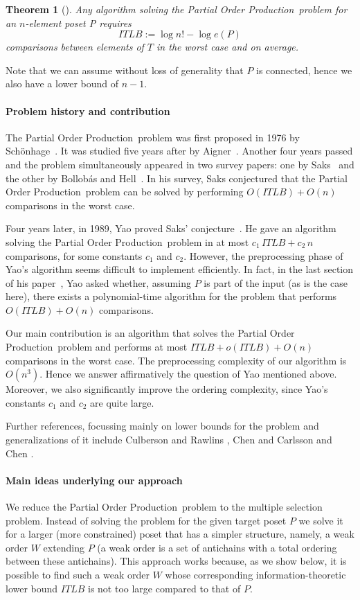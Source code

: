 \documentclass[12pt,oneside]{article}
\newtheorem{theorem}{Theorem}
\newcommand{\partsort}{{\sc Partial Order Production}}
\begin{document}
\begin{theorem}[\hspace{-.01em}\cite{S76, A81, Y89}]
Any algorithm solving the \partsort\ problem for an $n$-element poset P requires
\begin{equation*}
ITLB := \log n! - \log e(P)
\end{equation*}
comparisons between elements of $T$ in the worst case and on average.
\end{theorem}

Note that we can assume without loss of generality that $P$ is connected, hence we also have a lower bound of $n-1$.

\paragraph{Problem history and contribution}
The \partsort\ problem was first proposed in 1976 by Sch\"onhage~\cite{S76}. It was studied five years after by Aigner~\cite{A81}. Another four years passed and the problem simultaneously appeared in two survey papers: one by Saks~\cite{S85} and the other by Bollob\'as and Hell~\cite{BH85}. In his survey, Saks conjectured that the \partsort\ problem can be solved by performing $O(ITLB) + O(n)$ comparisons in the worst case.

Four years later, in 1989, Yao proved Saks' conjecture~\cite{Y89}. He gave an algorithm solving the \partsort\ problem in at most $c_1\,ITLB + c_2\,n$ comparisons, for some constants $c_1$ and $c_2$. However, the preprocessing phase of Yao's algorithm seems difficult to implement efficiently. In fact, in the last section of his paper~\cite{Y89}, Yao asked whether, assuming $P$ is part of the input (as is the case here), there exists a polynomial-time algorithm for the problem that performs $O(ITLB) + O(n)$ comparisons.

Our main contribution is an algorithm that solves the \partsort\ problem and performs at most $ITLB + o(ITLB) + O(n)$ comparisons in the worst case. The preprocessing complexity of our algorithm is $O(n^3)$. Hence we answer affirmatively the question of Yao \cite{Y89} mentioned above. Moreover, we also significantly improve the ordering complexity, since Yao's constants $c_1$ and $c_2$ are quite large.

Further references, focussing mainly on lower bounds for the problem and generalizations of it include Culberson and Rawlins \cite{CR88}, Chen \cite{C94} and Carlsson and Chen \cite{CC94}.

\paragraph{Main ideas underlying our approach} We reduce the \partsort\ problem to the multiple selection problem. Instead of solving the problem for the given target poset $P$ we solve it for a larger (more constrained) poset that has a simpler structure, namely, a weak order $W$ extending $P$ (a weak order is a set of antichains with a total ordering between these antichains). This approach works because, as we show below, it is possible to find such a weak order $W$ whose corresponding information-theoretic lower bound $ITLB$ is not too large compared to that of $P$.
\end{document}
